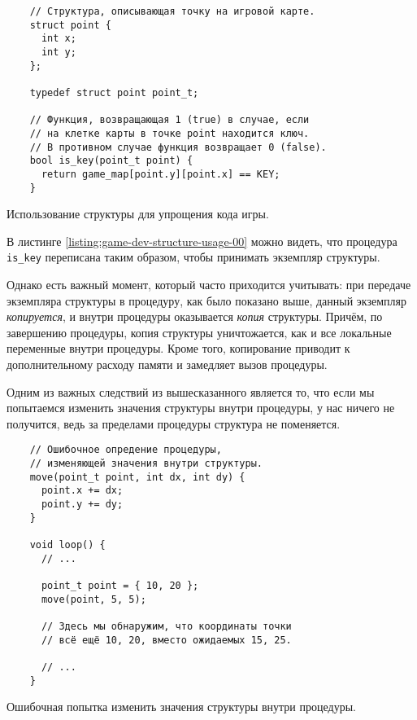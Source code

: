 \documentclass[../sparc.tex]{subfiles}
\begin{document}
\begin{listing}[H]
  \begin{verbatim}
    // Структура, описывающая точку на игровой карте.
    struct point {
      int x;
      int y;
    };

    typedef struct point point_t;

    // Функция, возвращающая 1 (true) в случае, если
    // на клетке карты в точке point находится ключ.
    // В противном случае функция возвращает 0 (false).
    bool is_key(point_t point) {
      return game_map[point.y][point.x] == KEY;
    }
  \end{verbatim}
  \caption{Использование структуры для упрощения кода игры.}
  \label{listing:game-dev-structure-usage-00}
\end{listing}

В листинге \ref{listing:game-dev-structure-usage-00} можно видеть, что процедура
\texttt{is\_key} переписана таким образом, чтобы принимать экземпляр структуры.

Однако есть важный момент, который часто приходится учитывать: при передаче
экземпляра структуры в процедуру, как было показано выше, данный экземпляр
\emph{копируется}, и внутри процедуры оказывается \emph{копия} структуры.
Причём, по завершению процедуры, копия структуры уничтожается, как и все
локальные переменные внутри процедуры.  Кроме того, копирование приводит к
дополнительному расходу памяти и замедляет вызов процедуры.

Одним из важных следствий из вышесказанного является то, что если мы попытаемся
изменить значения структуры внутри процедуры, у нас ничего не получится, ведь за
пределами процедуры структура не поменяется.

\begin{listing}[H]
  \begin{verbatim}
    // Ошибочное опредение процедуры,
    // изменяющей значения внутри структуры.
    move(point_t point, int dx, int dy) {
      point.x += dx;
      point.y += dy;
    }

    void loop() {
      // ...

      point_t point = { 10, 20 };
      move(point, 5, 5);

      // Здесь мы обнаружим, что координаты точки
      // всё ещё 10, 20, вместо ожидаемых 15, 25.

      // ...
    }
  \end{verbatim}
  \caption{Ошибочная попытка изменить значения структуры внутри процедуры.}
  \label{listing:game-dev-structure-usage-01}
\end{listing}
\end{document}
